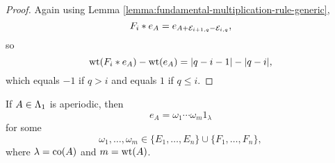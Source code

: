 \documentclass[a4paper, 11pt]{report}
\begin{document}
\begin{proof}
Again using Lemma \ref{lemma:fundamental-multiplication-rule-generic},
\begin{equation*}
F_i\ast e_A = e_{A + \mathcal{E}_{i+1,q} - \mathcal{E}_{i,q}},
\end{equation*}
so
\begin{equation*}
\operatorname{wt}(F_i\ast e_A) - \operatorname{wt}(e_A) = |q-i-1| - |q-i|,
\end{equation*}
which equals $-1$ if $q>i$ and equals $1$ if $q\le i$.
\end{proof}

\begin{lemma}\label{lemma:factorising-aperiodic-elements}
If $A\in\Lambda_1{}$ is aperiodic, then
\begin{equation*}
e_A = \omega_1\cdots\omega_m 1_\lambda
\end{equation*}
for some
\begin{equation*}
\omega_1,\ldots,\omega_m\in\{E_1,\ldots,E_n\}\cup\{F_1,\ldots,F_n\},
\end{equation*}
where $\lambda=\operatorname{co}(A)$ and $m=\operatorname{wt}(A)$.
\end{lemma}
\end{document}
